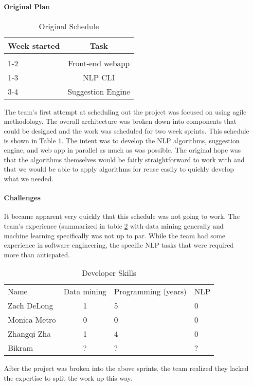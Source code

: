 
\paragraph{Original Plan}
\begin{table}[h]
\begin{center}
    \caption{Original Schedule}
    \begin{tabular}{ l c }
    \bf Week started & \bf Task \\ \hline \\
    1-2 & Front-end webapp  \\
    1-3 & NLP CLI  \\
    3-4 & Suggestion Engine 
    \end{tabular} \label{sec:devi-from-init-pln:original-timeline}
\end{center}
\end{table}

The team's first attempt at scheduling out the project was focused on
using agile methodology.  
The overall architecture was broken down into components that could be
designed and the work was scheduled for two week sprints.
This schedule is shown in Table
\ref{sec:devi-from-init-pln:original-timeline}.
The intent was to develop the NLP algorithms, suggestion engine, and
web app in parallel as much as was possible.
The original hope was that the algorithms themselves would be fairly
straightforward to work with and that we would be able to apply
algorithms for reuse easily to quickly develop what we needed.

\paragraph{Challenges}
It became apparent very quickly that this schedule was not going to
work.
The team's experience (summarized in table
\ref{sec:devi-from-init-pln:skillsets} with data mining generally and
machine learning specifically was not up to par.
While the team had some experience in software engineering, the
specific NLP tasks that were required more than anticpated.

\begin{table}[h]
    \caption{Developer Skills}
    \begin{tabular}{ l c l l}
    Name & Data mining & Programming (years) & NLP\\
    Zach DeLong & 1 & 5 & 0 \\
    Monica Metro &  0 & 0 & 0 \\
    Zhangqi Zha & 1 & 4 & 0\\
    Bikram & ? & ? & ?  
    \end{tabular} \label{sec:devi-from-init-pln:skillsets}
\end{table}

After the project was broken into the above sprints, the team realized
they lacked the expertise to split the work up this way.


